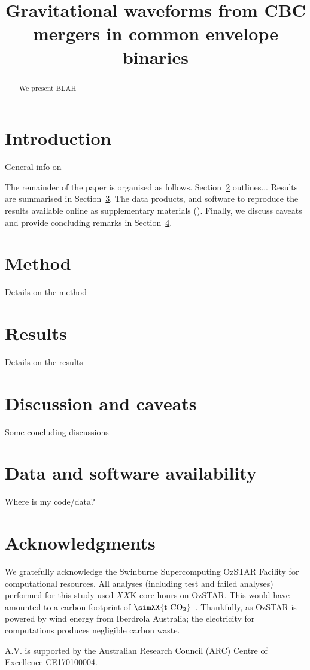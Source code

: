 \documentclass[floatfix,ApJL,twocolumn]{aastex631}
\begin{document}
\title{Gravitational waveforms from CBC mergers in common envelope binaries}







\begin{abstract}
We present BLAH
\end{abstract}




\section{Introduction} \label{sec:intro}

General  info on

The remainder of the paper is organised as follows.
Section~\ref{sec:method} outlines...
Results are summarised in Section~\ref{sec:results}.
The data products, and software to reproduce the results available online as supplementary materials (\projectUrl).
Finally, we discuss caveats and provide concluding remarks in Section~\ref{sec:conclusion}.

\section{Method} \label{sec:method}
Details on the method

\section{Results}\label{sec:results}
Details on the results

\section{Discussion and caveats}\label{sec:conclusion}
Some concluding discussions

\section{Data and software availability}\label{sec:data}
Where is my code/data?






\section*{Acknowledgments}{


We gratefully acknowledge the Swinburne Supercomputing OzSTAR Facility for computational resources. All analyses (including test and failed analyses) performed for this study used $XX$K core hours on OzSTAR. This would have amounted to a carbon footprint of ${\simXX{\text{t CO}_2}}$~\citep{greenhouse, energy_to_co2_converter}. Thankfully, as OzSTAR is powered by wind energy from Iberdrola Australia; the electricity for computations produces negligible carbon waste.


A.V. is supported by the Australian Research Council (ARC) Centre of Excellence CE170100004.

}
\end{document}
